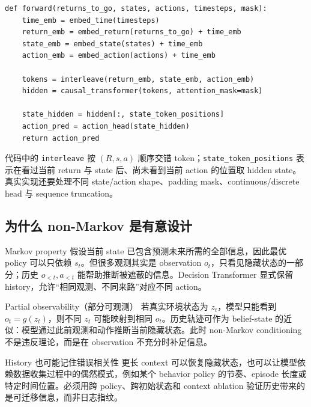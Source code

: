 \documentclass[a4paper]{article}
\begin{document}
\begin{lstlisting}[caption={Decision Transformer forward pass 的最小伪代码},label={lst:dt-forward}]
def forward(returns_to_go, states, actions, timesteps, mask):
    time_emb = embed_time(timesteps)
    return_emb = embed_return(returns_to_go) + time_emb
    state_emb = embed_state(states) + time_emb
    action_emb = embed_action(actions) + time_emb

    tokens = interleave(return_emb, state_emb, action_emb)
    hidden = causal_transformer(tokens, attention_mask=mask)

    state_hidden = hidden[:, state_token_positions]
    action_pred = action_head(state_hidden)
    return action_pred
\end{lstlisting}

代码中的 \texttt{interleave} 按 $(R,s,a)$ 顺序交错 token；\texttt{state\_token\_positions} 表示在看过当前 return 与 state 后、尚未看到当前 action 的位置取 hidden state。真实实现还要处理不同 state/action shape、padding mask、continuous/discrete head 与 sequence truncation。

\subsection{为什么 non-Markov 是有意设计}

Markov property 假设当前 state 已包含预测未来所需的全部信息，因此最优 policy 可以只依赖 $s_t$。但很多观测其实是 observation $o_t$，只看见隐藏状态的一部分；历史 $o_{<t},a_{<t}$ 能帮助推断被遮蔽的信息。Decision Transformer 显式保留 history，允许“相同观测、不同来路”对应不同 action。

\begin{knowledgebox}{Partial observability（部分可观测）}
若真实环境状态为 $z_t$，模型只能看到 $o_t=g(z_t)$，则不同 $z_t$ 可能映射到相同 $o_t$。历史轨迹可作为 belief-state 的近似：模型通过此前观测和动作推断当前隐藏状态。此时 non-Markov conditioning 不是违反理论，而是在 observation 不充分时补足信息。
\end{knowledgebox}


\begin{warningbox}{History 也可能记住错误相关性}
更长 context 可以恢复隐藏状态，也可以让模型依赖数据收集过程中的偶然模式，例如某个 behavior policy 的节奏、episode 长度或特定时间位置。必须用跨 policy、跨初始状态和 context ablation 验证历史带来的是可迁移信息，而非日志指纹。
\end{warningbox}
\end{document}
